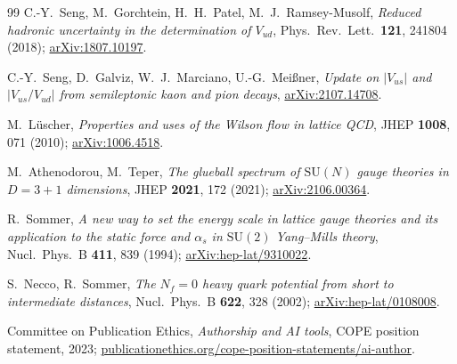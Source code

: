 \documentclass[aps,prl,reprint,amsmath,amssymb,nofootinbib,floatfix,superscriptaddress]{revtex4-2}
\newcommand{\SU}{\mathrm{SU}}
\begin{document}
\begin{thebibliography}{99}
C.-Y.~Seng, M.~Gorchtein, H.~H.~Patel, M.~J.~Ramsey-Musolf,
\emph{Reduced hadronic uncertainty in the determination of $V_{ud}$},
Phys.\ Rev.\ Lett.\ \textbf{121}, 241804 (2018);
\href{https://arxiv.org/abs/1807.10197}{arXiv:1807.10197}.

C.-Y.~Seng, D.~Galviz, W.~J.~Marciano, U.-G.~Mei\ss{}ner,
\emph{Update on $|V_{us}|$ and $|V_{us}/V_{ud}|$ from semileptonic kaon and pion decays},
\href{https://arxiv.org/abs/2107.14708}{arXiv:2107.14708}.

M.~L\"uscher,
\emph{Properties and uses of the Wilson flow in lattice QCD},
JHEP \textbf{1008}, 071 (2010);
\href{https://arxiv.org/abs/1006.4518}{arXiv:1006.4518}.

M.~Athenodorou, M.~Teper,
\emph{The glueball spectrum of $\SU(N)$ gauge theories in $D = 3 + 1$ dimensions},
JHEP \textbf{2021}, 172 (2021);
\href{https://arxiv.org/abs/2106.00364}{arXiv:2106.00364}.

R.~Sommer,
\emph{A new way to set the energy scale in lattice gauge theories and its application to the static force and $\alpha_s$ in $\SU(2)$ Yang--Mills theory},
Nucl.\ Phys.\ B \textbf{411}, 839 (1994);
\href{https://arxiv.org/abs/hep-lat/9310022}{arXiv:hep-lat/9310022}.

S.~Necco, R.~Sommer,
\emph{The $N_f = 0$ heavy quark potential from short to intermediate distances},
Nucl.\ Phys.\ B \textbf{622}, 328 (2002);
\href{https://arxiv.org/abs/hep-lat/0108008}{arXiv:hep-lat/0108008}.

Committee on Publication Ethics,
\emph{Authorship and AI tools},
COPE position statement, 2023;
\href{https://publicationethics.org/cope-position-statements/ai-author}{publicationethics.org/cope-position-statements/ai-author}.

\end{thebibliography}
\end{document}
